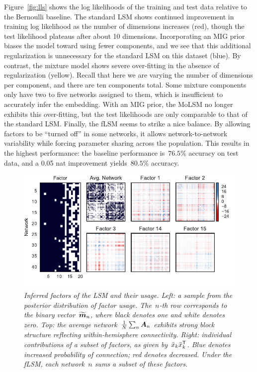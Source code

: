 Figure~\ref{fig:lls} shows the log likelihoods of the training and
test data relative to the Bernoulli baseline. The standard LSM shows continued
improvement in training log likelihood as the number of dimensions
increases (red), though the test likelihood plateaus after about 10
dimensions. Incorporating an MIG prior biases the model toward using
fewer components, and we see that this additional regularization is
unnecessary for the standard LSM on this dataset (blue).  By contrast,
the mixture model shows severe over-fitting in the absence of
regularization (yellow).  Recall that here we are varying the number
of dimensions per component, and there are ten components total.  Some
mixture components only have two to five networks assigned to them,
which is insufficient to accurately infer the embedding.  With an MIG
prior, the MoLSM no longer exhibits this over-fitting, but the test
likelihoods are only comparable to that of the standard LSM.  Finally,
the fLSM seems to strike a nice balance.  By allowing factors to be
``turned off'' in some networks, it allows network-to-network
variability while forcing parameter sharing across the
population. This results in the highest performance: the baseline
performance is~$76.5\%$ accuracy on test data, and a 0.05 nat
improvement yields~$80.5\%$ accuracy.


\begin{figure}[t]
  \includegraphics[width=\linewidth]{figures/factors.pdf}
  \vspace{-.4in}
  \caption{\textit{Inferred factors of the LSM and their usage. Left:
      a sample from the posterior distribution of factor
      usage. The~$n$-th row corresponds to the binary
      vector~$\widetilde{\boldsymbol{m}}_n$, where black denotes one and white
      denotes zero. Top: the average
      network~${\tfrac{1}{N}\sum_n \boldsymbol{A}_n}$ exhibits strong block
      structure reflecting within-hemisphere connectivity.  Right:
      individual contributions of a subset of factors, as given
      by~$\bar{x}_k \bar{x}_k^{\mathsf{T}}$.  Blue denotes increased
      probability of connection; red denotes decreased. Under the
      fLSM, each network~$n$ sums a subset of these factors. }}
\label{fig:factors}
\end{figure}

